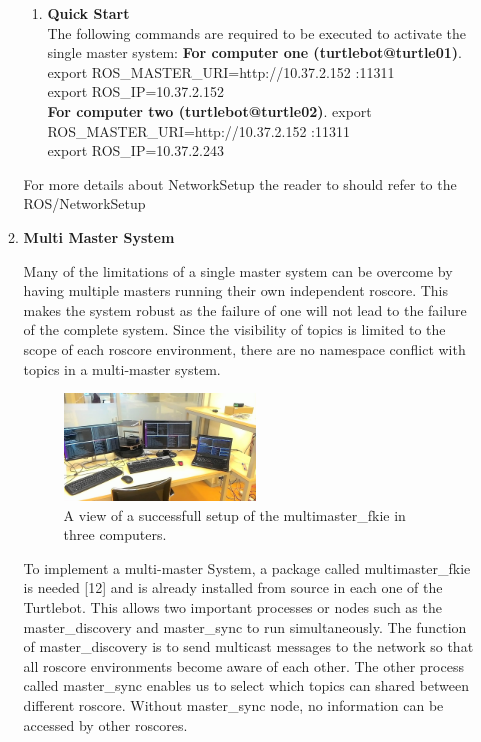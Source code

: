\documentclass[journal]{IEEEtran}
\begin{document}
\begin{enumerate}
\begin{enumerate}
\begin{enumerate}
\item \textbf {Quick Start}\\
The following commands are required to be executed to activate the single master system:
\textbf{For computer one (turtlebot@turtle01)}.\\
export ROS{\_}MASTER{\_}URI=http://10.37.2.152 :11311\\
export ROS{\_}IP=10.37.2.152\\
\textbf{For computer two (turtlebot@turtle02)}.
export ROS{\_}MASTER{\_}URI=http://10.37.2.152 :11311\\
export ROS{\_}IP=10.37.2.243
\end{enumerate}
For more details about NetworkSetup the reader to should refer to the ROS/NetworkSetup \cite{temp11}


\item \textbf {Multi Master System}

Many of the limitations of a single master system can
be overcome by having multiple masters running their own
independent roscore. This makes
the system robust as the failure of one will not lead to the
failure of the complete system. Since the visibility of topics is
limited to the scope of each roscore environment, there are
no namespace conflict with topics in a multi-master system.

\begin{figure}[!h]
\begin{center}
\includegraphics[width=2in]{multi2.jpg}
\caption{A view of a successfull setup of the multimaster{\_}fkie in three computers.}
\end{center}
\label{fig:mypicture4}
\end{figure}


To implement a multi-master System, a package called
multimaster{\_}fkie is needed [12] and is already installed from source in each one of the Turtlebot. This allows two important processes or nodes such as the master{\_}discovery and master{\_}sync to run
simultaneously. The function of master{\_}discovery is to
send multicast messages to the network so that all roscore
environments become aware of each other. The other process called master{\_}sync enables us to select which topics can shared between different roscore. Without master{\_}sync node, no information can be accessed by other roscores. 


\end{enumerate}
\end{enumerate}
\end{document}
